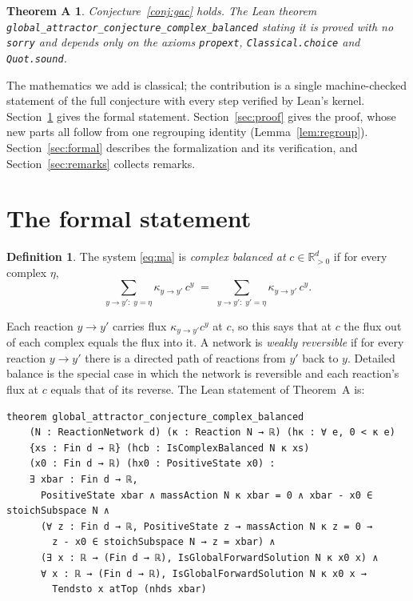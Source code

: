 \documentclass[11pt]{article}
\newcommand{\Rpos}{\mathbb{R}^{d}_{>0}}
\newcommand{\lean}[1]{\texttt{#1}}
\theoremstyle{plain}
\newtheorem*{theoremA}{Theorem A}
\theoremstyle{definition}
\newtheorem{definition}[theorem]{Definition}
\theoremstyle{remark}
\begin{document}
\begin{theoremA}
Conjecture~\ref{conj:gac} holds. The Lean theorem \lean{global\_\allowbreak attractor\_\allowbreak conjecture\_\allowbreak complex\_\allowbreak balanced} stating it is proved with no \lean{sorry} and depends only on the axioms \lean{propext}, \lean{Classical.choice} and \lean{Quot.sound}.
\end{theoremA}

The mathematics we add is classical; the contribution is a single machine-checked statement of the full conjecture with every step verified by Lean's kernel. Section~\ref{sec:statement} gives the formal statement. Section~\ref{sec:proof} gives the proof, whose new parts all follow from one regrouping identity (Lemma~\ref{lem:regroup}). Section~\ref{sec:formal} describes the formalization and its verification, and Section~\ref{sec:remarks} collects remarks.

\section{The formal statement}\label{sec:statement}

\begin{definition}\label{def:cb}
The system \eqref{eq:ma} is \emph{complex balanced at} $c \in \Rpos$ if for every complex $\eta$,
\[
\sum_{y \to y' :\; y = \eta} \kappa_{y\to y'}\, c^{y} \;=\; \sum_{y \to y' :\; y' = \eta} \kappa_{y\to y'}\, c^{y}.
\]
\end{definition}

\noindent Each reaction $y \to y'$ carries flux $\kappa_{y \to y'} c^y$ at $c$, so this says that at $c$ the flux out of each complex equals the flux into it. A network is \emph{weakly reversible} if for every reaction $y \to y'$ there is a directed path of reactions from $y'$ back to $y$. Detailed balance is the special case in which the network is reversible and each reaction's flux at $c$ equals that of its reverse. The Lean statement of Theorem~A is:

\begin{Verbatim}
theorem global_attractor_conjecture_complex_balanced
    (N : ReactionNetwork d) (κ : Reaction N → ℝ) (hκ : ∀ e, 0 < κ e)
    {xs : Fin d → ℝ} (hcb : IsComplexBalanced N κ xs)
    (x0 : Fin d → ℝ) (hx0 : PositiveState x0) :
    ∃ xbar : Fin d → ℝ,
      PositiveState xbar ∧ massAction N κ xbar = 0 ∧ xbar - x0 ∈ stoichSubspace N ∧
      (∀ z : Fin d → ℝ, PositiveState z → massAction N κ z = 0 →
        z - x0 ∈ stoichSubspace N → z = xbar) ∧
      (∃ x : ℝ → (Fin d → ℝ), IsGlobalForwardSolution N κ x0 x) ∧
      ∀ x : ℝ → (Fin d → ℝ), IsGlobalForwardSolution N κ x0 x →
        Tendsto x atTop (nhds xbar)
\end{Verbatim}
\end{document}
